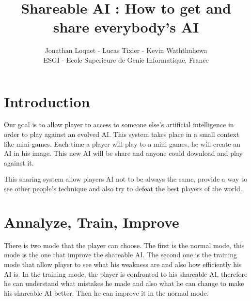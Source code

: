 \documentclass[conference]{acmsiggraph}
\title{Shareable AI : How to get and share everybody's AI}
\author{Jonathan Loquet - Lucas Tixier - Kevin Waththuhewa\\ESGI - Ecole Superieure de Genie Informatique, France}
\begin{document}

\maketitle




\copyrightspace

\section{Introduction}

Our goal is to allow player to access to someone else's artificial intelligence in order to play against an evolved AI. This system takes place in a small context like mini games. Each time a player will play to a mini games, he will create an AI in his image. This new AI will be share and anyone could download and play against it. 

This sharing system allow players AI not to be always the same, provide a way to see other people’s technique and also try to defeat the best players of the world.

\section{Annalyze, Train, Improve}

There is two mode that the player can choose. The first is the normal mode, this mode is the one that improve the shareable AI. The second one is the training mode that allow player to see what his weakness are and also how efficiently his AI is.
In the training mode, the player is confronted to his shareable AI, therefore he can understand what mistakes he made and also what he can change to make his shareable AI better. Then he can improve it in the normal mode.
\end{document}
